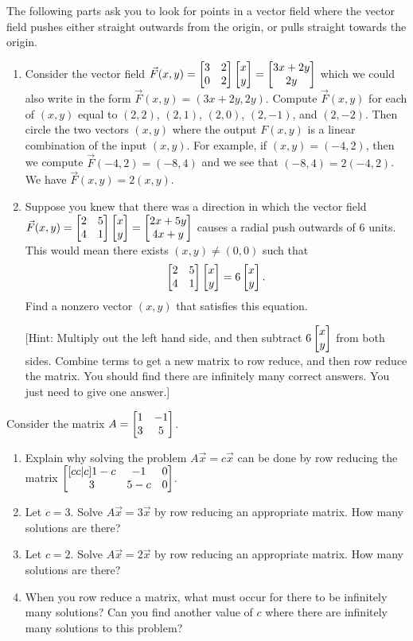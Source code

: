 \mysubsection{\ideaeig}
\begin{problem}
The following parts ask you to look for points in a vector field where the vector field pushes either straight outwards from the origin, or pulls straight towards the origin.
\begin{enumerate}
\item
Consider the vector field $\vec F(x,y) = \begin{bmatrix} 3&2\\0&2 \end{bmatrix}\begin{bmatrix} x\\y \end{bmatrix} = \begin{bmatrix} 3x+2y\\2y \end{bmatrix}$ which we could also write in the form
$\vec F(x,y)=(3x+2y,2y)$. 
Compute $\vec F(x,y)$ for each of $(x,y)$ equal to $(2,2)$, $(2,1)$, $(2,0)$, $(2,-1)$, and $(2,-2)$.  Then circle the two vectors $(x,y)$ where the output $F(x,y)$ is a linear combination of the input $(x,y)$. 
For example, if $(x,y)=(-4,2)$, then we compute $\vec F(-4,2) = (-8, 4)$ and we see that $(-8,4) = 2(-4,2)$.  We have $\vec F(x,y) = 2(x,y)$.
 \item Suppose you knew that there was a direction in which the vector field 
$\vec F(x,y) = \begin{bmatrix} 2&5\\4&1 \end{bmatrix}\begin{bmatrix} x\\y \end{bmatrix} = \begin{bmatrix} 2x+5y\\4x+y \end{bmatrix}$ causes a radial push outwards of 6 units. This would mean there exists $(x,y)\neq(0,0)$ such that 
$$\begin{bmatrix} 2&5\\4&1 \end{bmatrix}\begin{bmatrix} x\\y \end{bmatrix} = 6\begin{bmatrix} x\\y \end{bmatrix}.$$
Find a nonzero vector $(x,y)$ that satisfies this equation.

[Hint: Multiply out the left hand side, and then subtract $6\begin{bmatrix} x\\y \end{bmatrix}$ from both sides. Combine terms to get a new matrix to row reduce, and then row reduce the matrix. You should find there are infinitely many correct answers. You just need to give one answer.] 

\end{enumerate}
\end{problem}


\begin{problem}
 Consider the matrix $A=\begin{bmatrix} 1&-1\\3&5 \end{bmatrix}$.
\begin{enumerate}
 \item Explain why solving the problem $A\vec x = c\vec x$ can be done by row reducing the matrix $\begin{bmatrix} [cc|c]1-c&-1&0\\3&5-c&0 \end{bmatrix}$.
 \item Let $c=3$. Solve $A\vec x = 3\vec x$ by row reducing an appropriate matrix. How many solutions are there?
 \item Let $c=2$. Solve $A\vec x = 2\vec x$ by row reducing an appropriate matrix. How many solutions are there?
 \item  When you row reduce a matrix, what must occur for there to be infinitely many solutions?   
  Can you find another value of $c$ where there are infinitely many solutions to this problem?
\end{enumerate}

\end{problem}




